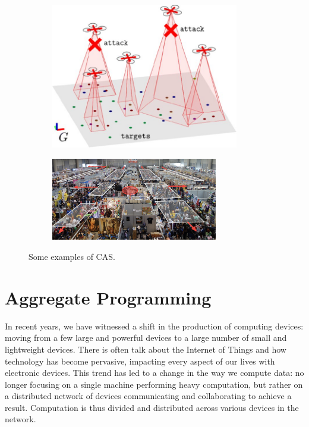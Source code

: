 \documentclass[12pt,a4paper,openright,twoside]{book}
\begin{document}
\begin{figure}[H]
  \centering
  \begin{subfigure}[b]{0.49\textwidth}
      \centering
      \includegraphics[width=0.9\textwidth]{figures/swarm2.jpeg}
  \end{subfigure}

  \begin{subfigure}[b]{0.49\textwidth}
      \centering
      \includegraphics[width=0.8\textwidth]{figures/crowd.png}
  \end{subfigure}
  \caption{Some examples of CAS.}
\end{figure}

\section{Aggregate Programming}

In recent years, we have witnessed a shift in the production of computing devices: moving from a few large and powerful devices to a large number of small and lightweight devices. 
There is often talk about the Internet of Things and how technology has become pervasive, impacting every aspect of our lives with electronic devices.
This trend has led to a change in the way we compute data: no longer focusing on a single machine performing heavy computation, but rather on a distributed network of devices communicating and collaborating to achieve a result. 
Computation is thus divided and distributed across various devices in the network.
\end{document}
